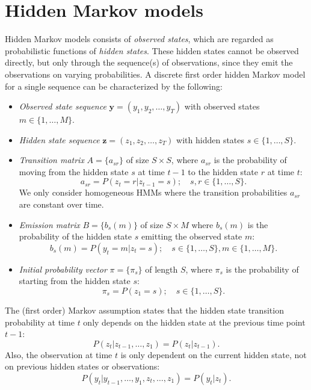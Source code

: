 \documentclass[12pt]{article}\usepackage[]{graphicx}\usepackage[]{color}
\begin{document}
\section{Hidden Markov models}

Hidden Markov models consists of \emph{observed states}, which are regarded as probabilistic functions of \emph{hidden states}. These hidden states cannot be observed directly, but only through the sequence(s) of observations, since they emit the observations on varying probabilities. A discrete first order hidden Markov model for a single sequence can be characterized by the following:

\begin{itemize}
\item \emph{Observed state sequence} $\textbf{y}=(y_1, y_2, \ldots, y_T)$
  with observed states $m\in\{1, \ldots, M\}$.

\item \emph{Hidden state sequence} $\textbf{z}=(z_1, z_2,\ldots, z_T)$
with hidden states $s\in\{1, \ldots, S\}$.

\item \emph{Transition matrix} $A = \{a_{sr}\}$ of size $S \times S$, where $a_{sr}$ is the probability of moving from the hidden state $s$ at time $t-1$ to the hidden state $r$ at time $t$:
        \[a_{sr}	= P(z_t=r|z_{t-1}=s);\quad s,r \in\{1, \ldots, S\}.
				\]
        We only consider homogeneous HMMs where the transition probabilities $a_{sr}$ are constant over time.

\item \emph{Emission matrix} $B=\{b_s(m)\}$ of size $S \times M$ where $b_s(m)$ is the probability of the hidden state $s$ emitting the observed state $m$:
  			\[b_{s}(m)=P(y_t=m|z_t=s); \quad s\in\{1, \ldots, S\}, m\in\{1, \ldots, M\}.
				\]

\item \emph{Initial probability vector} $\pi=\{\pi_s\}$ of length $S$, where $\pi_s$ is the probability of starting from the hidden state $s$:
  			\[\pi_s = P(z_1=s);\quad s\in \{1, \ldots, S\}.
				\]

  \end{itemize}
The (first order) Markov assumption states that the hidden state transition probability at time $t$ only depends on the hidden state at the previous time point $t-1$:
\begin{equation}
P(z_t|z_{t-1},\ldots,z_1)=P(z_t|z_{t-1}).
\end{equation}
Also, the observation at time $t$ is only dependent on the current hidden state, not on previous hidden states or observations:
\begin{equation}
P(y_t|y_{t-1},\ldots,y_1,z_t,\ldots,z_1)=P(y_t|z_t).
\end{equation}
\end{document}
